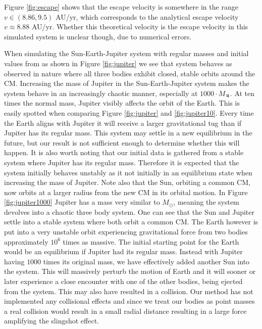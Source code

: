 \documentclass[twocolumn]{aastex62}
\begin{document}
Figure \ref{fig:escape} shows that the escape velocity is somewhere 
in the range $v\in(8.86, 9.5)$ AU/yr, which corresponds to 
the analytical escape velocity $v\approx 8.88$ AU/yr. Whether this theoretical 
velocity is the escape velocity in this simulated system is unclear 
though, due to numerical errors.

When simulating the Sun-Earth-Jupiter system with regular masses and 
initial values from \cite{nasa:2018} as shown in Figure 
\ref{fig:jupiter} we see that system behaves as observed in nature 
where all three bodies exhibit closed, stable orbits around the CM.
Increasing the mass of Jupiter in the Sun-Earth-Jupiter system makes the 
system behave in an increasingly chaotic manner, especially at 
$1000 \cdot M_\mathrm{\jupiter}$. At ten times the normal mass, 
Jupiter visibly affects the orbit of the Earth. This is easily spotted  
when comparing Figure \ref{fig:jupiter} and \ref{fig:jupiter10}. Every 
time the Earth aligns with Jupiter it will receive a larger gravitational tug than if Jupiter has its regular mass. This system may settle in a new equilibrium in the future, but our result is not sufficient enough to determine whether this will happen. It is also worth noting that our initial data is gathered from a stable system where Jupiter has its regular mass. Therefore it is expected that the system initially behaves unstably as it not initially in an equilibrium state when increasing the mass of Jupiter. Note also that the Sun, orbiting a common CM, now orbits at a larger radius from the new CM in its orbital motion. 
In Figure \ref{fig:jupiter1000} Jupiter has a mass very similar to $M_\odot$, meaning the system devolves 
into a chaotic three body system. One can see that the Sun and Jupiter settle into a stable system where both orbit a common CM. The Earth however is put into a very unstable orbit experiencing gravitational force from two bodies approximately $10^6$ times as massive. The initial starting point for the Earth would be an equilibrium if Jupiter had its regular mass. Instead with Jupiter having $1000$ times its original mass, we have effectively added another Sun into the system. This will massively perturb the motion of Earth and it will sooner or later experience a close encounter with one of the other bodies, being ejected from the system. This may also have resulted in a collision. Our method  has not implemented any collisional effects and since we treat our bodies as point masses a real collision would result in a small radial distance resulting in a large force amplifying the slingshot effect.
\end{document}
